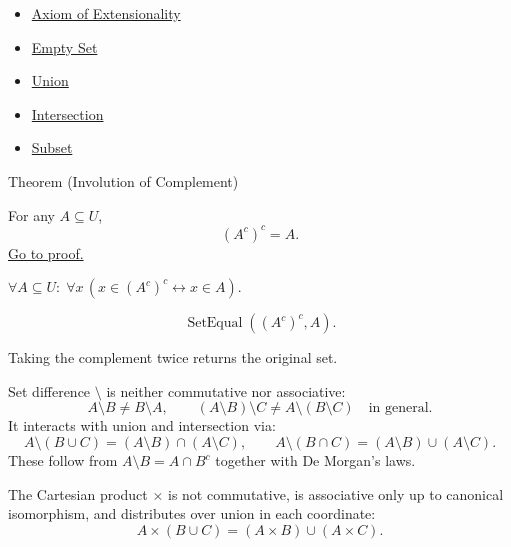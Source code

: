 \begin{dependencies}
\begin{itemize}
  \item \hyperref[ax:extensionality]{Axiom of Extensionality}
  \item \hyperref[def:empty-set]{Empty Set}
  \item \hyperref[def:union]{Union}
  \item \hyperref[def:intersection]{Intersection}
  \item \hyperref[def:subset]{Subset}
\end{itemize}
\end{dependencies}

\begin{theorembox}{Theorem (Involution of Complement)}
\begin{theorem}\label{thm:involution}
For any $A \subseteq U$,
\[
(A^c)^c = A.
\]
\hyperref[prf:involution]{Go to proof.}
\end{theorem}
\end{theorembox}

\begin{remark*}
$\forall A \subseteq U:\; \forall x\,(x \in (A^c)^c \leftrightarrow x \in A)$.
\end{remark*}

\begin{remark*}
\[
  \operatorname{SetEqual}((A^c)^c,A).
\]
\end{remark*}

\begin{remark*}[Interpretation]
Taking the complement twice returns the original set.
\end{remark*}

\begin{remark*}[Exposition]
Set difference $\setminus$ is neither commutative nor associative:
\[
A \setminus B \neq B \setminus A,
\qquad
(A \setminus B) \setminus C \neq A \setminus (B \setminus C) \quad \text{in general}.
\]
It interacts with union and intersection via:
\[
A \setminus (B \cup C) = (A \setminus B) \cap (A \setminus C),
\qquad
A \setminus (B \cap C) = (A \setminus B) \cup (A \setminus C).
\]
These follow from $A \setminus B = A \cap B^c$ together with De Morgan's laws.
\end{remark*}

\begin{remark*}[Exposition]
The Cartesian product $\times$ is not commutative, is associative only up to
canonical isomorphism, and distributes over union in each coordinate:
\[
A \times (B \cup C) = (A \times B) \cup (A \times C).
\]
\end{remark*}

